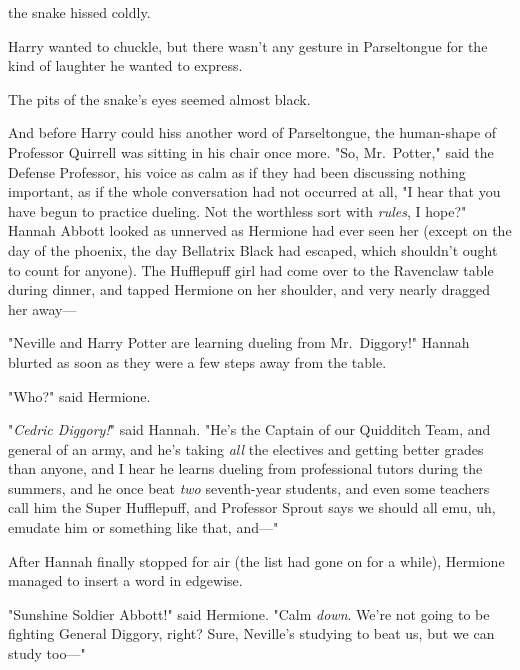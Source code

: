  the snake hissed coldly. 

Harry wanted to chuckle, but there wasn't any gesture in Parseltongue for the
kind of laughter he wanted to express.

The pits of the snake's eyes seemed almost black. 

And before Harry could hiss another word of Parseltongue, the human-shape of
Professor Quirrell was sitting in his chair once more. "So, Mr.~Potter," said
the Defense Professor, his voice as calm as if they had been discussing nothing
important, as if the whole conversation had not occurred at all, "I hear that
you have begun to practice dueling. Not the worthless sort with \emph{rules}, I
hope?"
\sbreak
Hannah Abbott looked as unnerved as Hermione had ever seen her (except on the
day of the phoenix, the day Bellatrix Black had escaped, which shouldn't ought
to count for anyone). The Hufflepuff girl had come over to the Ravenclaw table
during dinner, and tapped Hermione on her shoulder, and very nearly dragged her
away---

"Neville and Harry Potter are learning dueling from Mr.~Diggory!" Hannah
blurted as soon as they were a few steps away from the table.

"Who?" said Hermione.

"\emph{Cedric Diggory!}" said Hannah. "He's the Captain of our Quidditch Team,
and general of an army, and he's taking \emph{all} the electives and getting
better grades than anyone, and I hear he learns dueling from professional
tutors during the summers, and he once beat \emph{two} seventh-year students,
and even some teachers call him the Super Hufflepuff, and Professor Sprout says
we should all emu, uh, emudate him or something like that, and\mbox{---}"

After Hannah finally stopped for air (the list had gone on for a while),
Hermione managed to insert a word in edgewise.

"Sunshine Soldier Abbott!" said Hermione. "Calm \emph{down}. We're not going to
be fighting General Diggory, right? Sure, Neville's studying to beat us, but we
can study too\mbox{---}"

